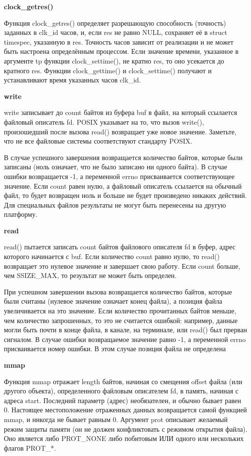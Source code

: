 \documentclass[a4paper, 14pt]{article}
\begin{document}
\textbf{clock\_getres()}

\par Функция clock\_getres() определяет разрешающую способность (точность) заданных в clk\_id часов, и, если res не равно NULL, сохраняет её в struct timespec, указанную в res. Точность часов зависит от реализации и не может быть настроена определённым процессом. Если значение времени, указанное в аргументе tp функции clock\_settime(), не кратно res, то оно усекается до кратного res.
Функции clock\_gettime() и clock\_settime() получают и устанавливают время указанных часов clk\_id.

\textbf{write}

\par write записывает до count байтов из буфера buf в файл, на который ссылается файловый описатель fd. POSIX указывает на то, что вызов write(), произошедший после вызова read() возвращает уже новое значение. Заметьте, что не все файловые системы соответствуют стандарту POSIX.  \\

\par В случае успешного завершения возвращается количество байтов, которые были записаны (ноль означает, что не было записано ни одного байта). В случае ошибки возвращается -1, а переменной errno присваивается соответствующее значение. Если count равен нулю, а файловый описатель ссылается на обычный файл, то будет возвращен ноль и больше не будет произведено никаких действий. Для специальных файлов результаты не могут быть перенесены на другую платформу.

\textbf{read}

\par read() пытается записать count байтов файлового описателя fd в буфер, адрес которого начинается с buf.
Если количество count равно нулю, то read() возвращает это нулевое значение и завершает свою работу. Если count больше, чем SSIZE\_MAX, то результат не может быть определен. 

\par При успешном завершении вызова возвращается количество байтов, которые были считаны (нулевое значение означает конец файла), а позиция файла увеличивается на это значение. Если количество прочитанных байтов меньше, чем количество запрошенных, то это не считается ошибкой: например, данные могли быть почти в конце файла, в канале, на терминале, или read() был прерван сигналом. В случае ошибки возвращаемое значение равно -1, а переменной errno присваивается номер ошибки. В этом случае позиция файла не определена

\textbf{mmap}

\par Функция mmap отражает length байтов, начиная со смещения offset файла (или другого объекта), определенного файловым описателем fd, в память, начиная с адреса start. Последний параметр (адрес) необязателен, и обычно бывает равен 0. Настоящее местоположение отраженных данных возвращается самой функцией mmap, и никогда не бывает равным 0.
Аргумент prot описывает желаемый режим защиты памяти (он не должен конфликтовать с режимом открытия файла). Оно является либо PROT\_NONE либо побитовым ИЛИ одного или нескольких флагов PROT\_*.
\end{document}
